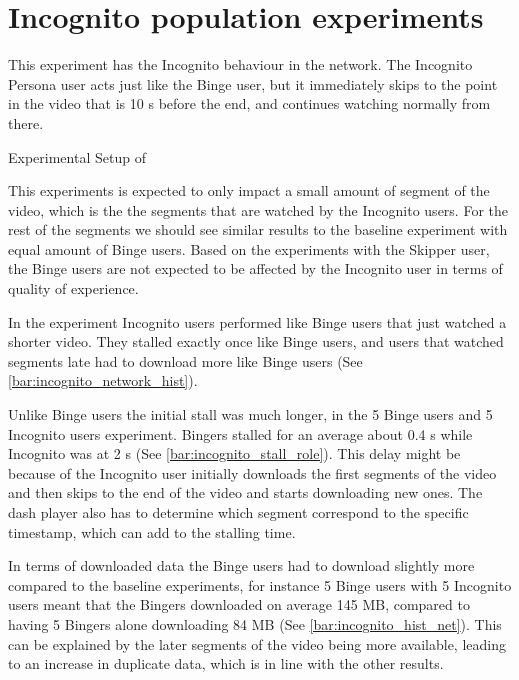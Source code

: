 \if{}

\fi
 
\FloatBarrier \section{Incognito population experiments}
\label{sec:eval_incognito}
This experiment has the Incognito behaviour in the network.
The Incognito Persona user acts just like the Binge user, but it immediately skips to the point in the video that is 10 \ac{s} before the end, and continues watching normally from there.

\begin{table}[!htbp]
    \myfloatalign
    \caption[Experimental Setup of Incognito]{Experimental Setup of }
    \label{tab:exp_overview_incognito}
    
\end{table}

This experiments is expected to only impact a small amount of segment of the video, which is the the segments that are watched by the Incognito users.
For the rest of the segments we should see similar results to the baseline experiment with equal amount of Binge users. Based on the experiments with the Skipper user, the Binge users are not expected to be affected by the Incognito user in terms of quality of experience.

In the experiment Incognito users performed like Binge users that just watched a shorter video. They stalled exactly once like Binge users, and users that watched segments late had to download more like Binge users (See \autoref{bar:incognito_network_hist}). 

\if{}

\fi

Unlike Binge users the initial stall was much longer, in the 5 Binge users and 5 Incognito users experiment. Bingers stalled for an average about 0.4 \ac{s} while Incognito was at 2 \ac{s} (See \autoref{bar:incognito_stall_role}). This delay might be because of the Incognito user initially downloads the first segments of the video and then skips to the end of the video and starts downloading new ones. The dash player also has to determine which segment correspond to the specific timestamp, which can add to the stalling time.

\if{}

\fi

In terms of downloaded data the Binge users had to download slightly more compared to the baseline experiments, for instance 5 Binge users with 5 Incognito users meant that the Bingers downloaded on average 145 \ac{MB}, compared to having 5 Bingers alone downloading 84 \ac{MB} (See \autoref{bar:incognito_hist_net}). This can be explained by the later segments of the video being more available, leading to an increase in duplicate data, which is in line with the other results.

